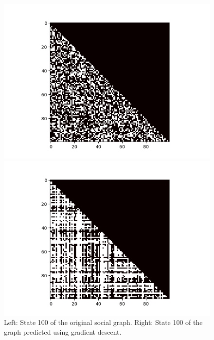 \begin{figure}
    \begin{minipage}{0.49\textwidth}
        \begin{center}
            \includegraphics[scale=0.5]{figures/original-linear.png}
        \end{center}
    \end{minipage}
    \begin{minipage}{0.49\textwidth}
        \begin{center}
            \includegraphics[scale=0.5]{figures/scg-linear.png}
        \end{center}
    \end{minipage}
	\caption{
        Left: State 100 of the original social graph.
        Right: State 100 of the graph predicted using gradient descent.
	}
    \label{fig:sgd-social-linear}
\end{figure}

